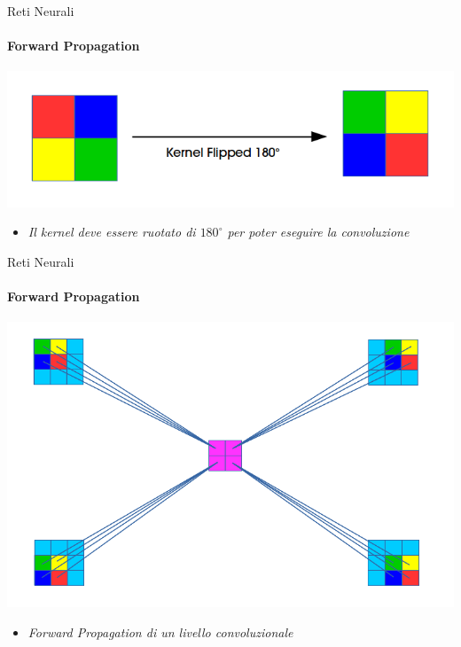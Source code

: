 \documentclass[
 ]{beamer}
\begin{document}
\begin{frame}{Reti Neurali}
    \framesubtitle{Forward Propagation} 
    
    \bigskip
    
    \begin{center}
      \includegraphics[scale = 0.4]{forward_flipped.png}
    \end{center}
  
    \bigskip \smallskip
        
    \begin{itemize}
        \setlength\itemsep{1em}
        \item[] \large \emph{Il kernel deve essere ruotato di $180^\circ$ per poter eseguire la convoluzione}
    \end{itemize}
\end{frame}

\begin{frame}{Reti Neurali}
    \framesubtitle{Forward Propagation} 
    
    \begin{center}
      \includegraphics[scale = 0.35]{forward_conv2.png}
    \end{center}
        
    \begin{itemize}
        \setlength\itemsep{1em}
        \item[] \large \emph{Forward Propagation di un livello convoluzionale}
    \end{itemize}
\end{frame}
\end{document}
